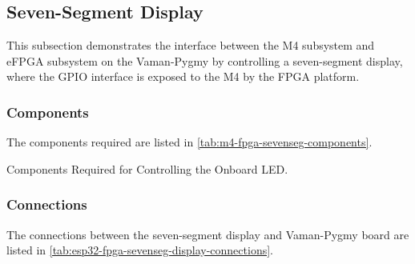 \subsection{Seven-Segment Display}
This subsection demonstrates the interface between the M4 subsystem and eFPGA
subsystem on the Vaman-Pygmy by controlling a seven-segment display, where the
GPIO interface is exposed to the M4 by the FPGA platform.

\subsubsection{Components}
The components required are listed in \autoref{tab:m4-fpga-sevenseg-components}.
\begin{table}[!ht]
    \centering
    
    \caption{Components Required for Controlling the Onboard LED.}
    \label{tab:m4-fpga-sevenseg-components}
\end{table}

\subsubsection{Connections}
The connections between the seven-segment display and Vaman-Pygmy board are
listed in \autoref{tab:esp32-fpga-sevenseg-display-connections}.

